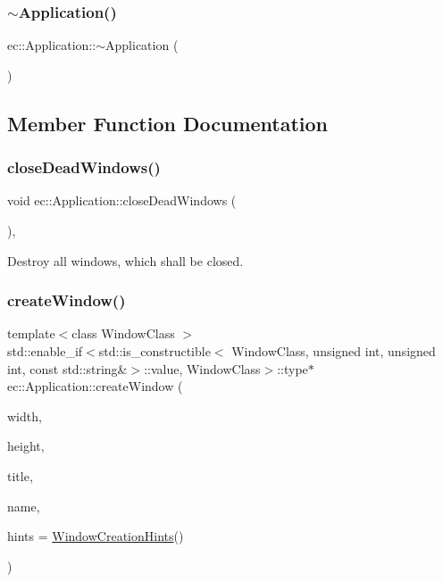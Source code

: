 \subsubsection{\texorpdfstring{$\sim$\+Application()}{~Application()}}
{\footnotesize\ttfamily ec\+::\+Application\+::$\sim$\+Application (\begin{DoxyParamCaption}{ }\end{DoxyParamCaption})\hspace{0.3cm}{\ttfamily [default]}}



\subsection{Member Function Documentation}
\mbox{\label{classec_1_1_application_ad6a3915f4ea913bf392a03fbd3548d99}} 
\subsubsection{\texorpdfstring{close\+Dead\+Windows()}{closeDeadWindows()}}
{\footnotesize\ttfamily void ec\+::\+Application\+::close\+Dead\+Windows (\begin{DoxyParamCaption}{ }\end{DoxyParamCaption})\hspace{0.3cm}{\ttfamily [protected]}, {\ttfamily [virtual]}}

Destroy all windows, which shall be closed. \mbox{\label{classec_1_1_application_af103b97a3296f63ec0597756628e26f9}} 
\subsubsection{\texorpdfstring{create\+Window()}{createWindow()}\hspace{0.1cm}{\footnotesize\ttfamily [1/2]}}
{\footnotesize\ttfamily template$<$class Window\+Class $>$ \\
std\+::enable\+\_\+if$<$std\+::is\+\_\+constructible$<$ Window\+Class, unsigned int, unsigned int, const std\+::string\&$>$\+::value, Window\+Class$>$\+::type$\ast$ ec\+::\+Application\+::create\+Window (\begin{DoxyParamCaption}\item[{unsigned int}]{width,  }\item[{unsigned int}]{height,  }\item[{const std\+::string \&}]{title,  }\item[{const std\+::string \&}]{name,  }\item[{\mbox{\hyperlink{structec_1_1_window_creation_hints}{Window\+Creation\+Hints}}}]{hints = {\ttfamily \mbox{\hyperlink{structec_1_1_window_creation_hints}{Window\+Creation\+Hints}}()} }\end{DoxyParamCaption})}


